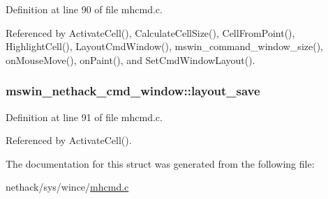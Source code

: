 Definition at line 90 of file mhcmd.\+c.



Referenced by Activate\+Cell(), Calculate\+Cell\+Size(), Cell\+From\+Point(), Highlight\+Cell(), Layout\+Cmd\+Window(), mswin\+\_\+command\+\_\+window\+\_\+size(), on\+Mouse\+Move(), on\+Paint(), and Set\+Cmd\+Window\+Layout().

\hypertarget{structmswin__nethack__cmd__window_a6ce098bf49ef1d66ca15487b0df1817a}{
\subsubsection[{layout\+\_\+save}]{ mswin\+\_\+nethack\+\_\+cmd\+\_\+window\+::layout\+\_\+save}}\label{structmswin__nethack__cmd__window_a6ce098bf49ef1d66ca15487b0df1817a}


Definition at line 91 of file mhcmd.\+c.



Referenced by Activate\+Cell().



The documentation for this struct was generated from the following file\+:\begin{DoxyCompactItemize}
\item 
nethack/sys/wince/\hyperlink{mhcmd_8c}{mhcmd.\+c}\end{DoxyCompactItemize}
